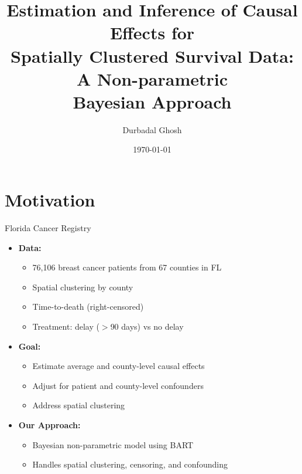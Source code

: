 \documentclass{beamer}
\title{Estimation and Inference of Causal Effects for \\ Spatially Clustered Survival Data: A Non-parametric \\ Bayesian Approach}
\author{Durbadal Ghosh}
\date{\today}
\begin{document}
\begin{frame}
  \titlepage
\end{frame}



\section{Motivation}



\begin{frame}{Florida Cancer Registry}
    \begin{itemize}
      \vfill \item \textbf{Data:}
      \begin{itemize}
        \vfill \item 76,106 breast cancer patients from 67 counties in FL
        \vfill \item Spatial clustering by county
        \vfill \item Time-to-death (right-censored)
        \vfill \item Treatment: delay ($>$90 days) vs no delay
      \end{itemize}
      \vspace{6pt}
      \vfill \item \textbf{Goal:}
      \begin{itemize}
        \vfill \item Estimate average and county-level causal effects
        \vfill \item Adjust for patient and county-level confounders
        \vfill \item Address spatial clustering
      \end{itemize}
      \vspace{6pt}
      \vfill \item \textbf{Our Approach:}
      \begin{itemize}
        \vfill \item Bayesian non-parametric model using BART
        \vfill \item Handles spatial clustering, censoring, and confounding
      \end{itemize}
    \end{itemize}
    \end{frame}
\end{document}
